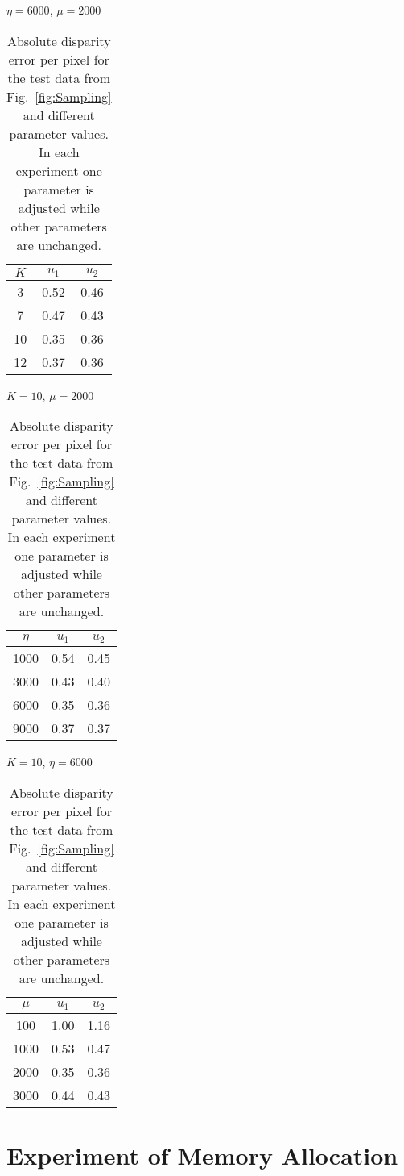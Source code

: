 \begin{table}[h]
	\caption{Absolute disparity error per pixel for the test data from
		Fig.~\ref{fig:Sampling} and different parameter values. In each experiment one
		parameter is adjusted while other parameters are unchanged.} 
	\centering
	\begin{minipage}[b]{0.30\linewidth}
		\centerline{$\eta=6000$, $\mu=2000$}\smallskip
		\centering
		\begin{tabular}{ccc}
			\hline
			$K$ & $u_1$ & $u_2$\\
			\hline
			3   & 0.52 &0.46\\
			7   & 0.47 &0.43\\
			10  & 0.35 &0.36\\
			12  & 0.37 &0.36\\
			\hline
		\end{tabular}
	\end{minipage}
	\begin{minipage}[b]{0.34\linewidth}
		\centerline{$K=10$, $\mu=2000$}\smallskip
		\centering
		\begin{tabular}{ccc}
			\hline
			$\eta$ & $u_1$ & $u_2$\\
			\hline
			1000&0.54& 0.45\\
			3000&0.43& 0.40\\
			6000&0.35& 0.36\\
			9000&0.37& 0.37\\
			\hline
		\end{tabular}
	\end{minipage}
	\begin{minipage}[b]{0.32\linewidth}
		\centerline{$K=10$, $\eta=6000$}\smallskip
		\centering
		\begin{tabular}{ccc}
			\hline
			$\mu$ & $u_1$ & $u_2$\\
			\hline
			100 &1.00&1.16\\
			1000&0.53&0.47\\
			2000&0.35&0.36\\
			3000&0.44&0.43\\
			\hline
		\end{tabular}
	\end{minipage}
	\label{tab:Parameters}
\end{table}

\section{Experiment of Memory Allocation}
\label{sec:history}

\clearpage

